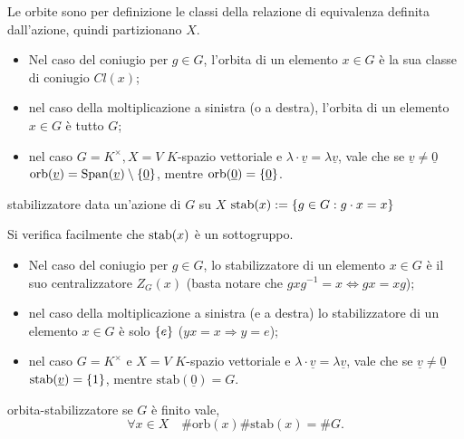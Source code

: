 Le orbite sono per definizione le classi della relazione di equivalenza definita dall'azione, quindi partizionano $X$.
\begin{itemize}
    \item Nel caso del coniugio per $g \in G$, l'orbita di un elemento $x \in G$ è la sua classe di coniugio $Cl(x)$;
    \item nel caso della moltiplicazione a sinistra (o a destra), l'orbita di un elemento $x \in G$ è tutto $G$;
    \item nel caso $G = K^\times, X = V$ $K$-spazio vettoriale e $\lambda \cdot \underline{v} = \lambda\underline{v}$, vale che se $\underline{v} \neq \underline{0}$ $\text{orb}(\underline{v}) = \text{Span}(\underline{v}) \setminus \left\{ \underline{0} \right\}$, mentre $\text{orb}(\underline{0}) = \left\{ \underline{0} \right\}$.
    \end{itemize}
\begin{definition}{stabilizzatore}
    data un'azione di $G$ su $X$ $\text{stab}(x) := \left\{ g \in G : g \cdot x = x \right\} $
\end{definition} 
Si verifica facilmente che $\text{stab}(x)$ è un sottogruppo.
\begin{itemize}
    \item Nel caso del coniugio per $g \in G$, lo stabilizzatore di un elemento $x \in G$ è il suo centralizzatore $Z_G(x)$ (basta notare che $gxg^{-1} = x \Longleftrightarrow gx = xg$);
    \item nel caso della moltiplicazione a sinistra (e a destra) lo stabilizzatore di un elemento $x \in G$ è solo $\left\{ e \right\}$ ($yx = x \Rightarrow y = e$);
    \item nel caso $G = K^\times$ e $X = V$ $K$-spazio vettoriale e $\lambda \cdot \underline{v} = \lambda\underline{v}$, vale che se $\underline{v} \neq \underline{0}$ $\text{stab}(\underline{v}) = \left\{ 1 \right\}$, mentre $\text{stab}(\underline{0}) = G$.
    \end{itemize}
\begin{lemma}{orbita-stabilizzatore}
    se $G$ è finito vale,
    \[
    \forall x \in X \quad \#\text{orb}(x) \#\text{stab}(x) = \#G.
    \]
\end{lemma}
